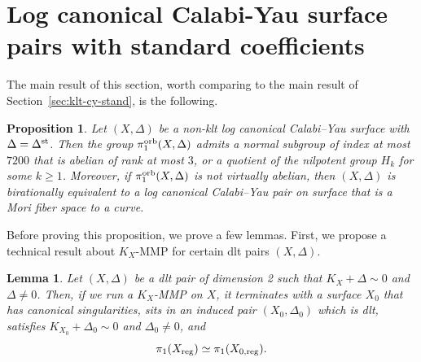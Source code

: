 \documentclass{amsart}
\newtheorem{lemma}[theorem]{Lemma}
\newtheorem{proposition}[theorem]{Proposition}
\theoremstyle{definition}
\theoremstyle{remark}
\numberwithin{equation}{section}
\begin{document}
\section{Log canonical Calabi-Yau surface pairs with standard coefficients}

The main result of this section, worth comparing to the main result of Section~\ref{sec:klt-cy-stand}, is the following.

\begin{proposition}\label{prop:lc-cy}
Let $(X,\Delta)$ be a non-klt log canonical Calabi--Yau surface with $\Delta=\Delta^{\rm st}$.
Then the group $\pi_1^{\rm orb}(X,\Delta)$ admits a normal subgroup of index at most $7200$ that is abelian of rank at most $3$, or a quotient of the nilpotent group $H_k$ for some $k\ge 1$. Moreover, if $\pi_1^{\rm orb}(X,\Delta)$ is not virtually abelian, then $(X,\Delta)$ is birationally equivalent to a log canonical Calabi--Yau pair on surface that is a Mori fiber space to a curve.
\end{proposition}


Before proving this proposition, we prove a few lemmas. First, we propose a technical result about $K_X$-MMP for certain dlt pairs $(X,\Delta)$.

\begin{lemma}\label{lem:MMP-and-pi1reg}
    Let $(X,\Delta)$ be a dlt pair of dimension 2 such that $K_X+\Delta\sim 0$ and $\Delta\ne 0$.
    Then, if we run a $K_X$-MMP on $X$, it terminates with a surface $X_0$ that has canonical singularities, sits in an induced pair $(X_0,\Delta_0)$ which is dlt, satisfies $K_{X_0}+\Delta_0\sim 0$ and $\Delta_0\neq 0$, and 
    $$\pi_1({X}_{{\rm reg}})\simeq \pi_1(X_{0,{\rm reg }}).$$
\end{lemma}
\end{document}

